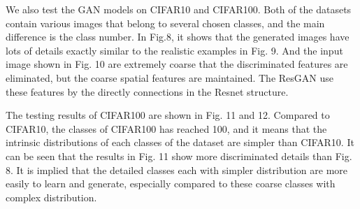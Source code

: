 \documentclass[publish,JACIII,paper]{jaciiiarticle}
\begin{document}

We also test the GAN models on CIFAR10 and CIFAR100.
Both of the datasets contain various images that belong to several chosen classes,
and the main difference is the class number.
In Fig.8, it shows that the generated images have lots of details exactly similar to the realistic examples in Fig. 9.
And the input image shown in Fig. 10 are extremely coarse that the discriminated features are eliminated,
but the coarse spatial features are maintained. The ResGAN use these features by the directly connections in the Resnet structure. 




The testing results of CIFAR100 are shown in Fig. 11 and 12.
Compared to CIFAR10, the classes of CIFAR100 has reached 100, 
and it means that the intrinsic distributions of each classes of the dataset are simpler than CIFAR10.
It can be seen that the results in Fig. 11 show more discriminated details than Fig. 8. 
It is implied that the detailed classes each with simpler distribution are more easily to learn and generate,
especially compared to these coarse classes with complex distribution.

\end{document}
